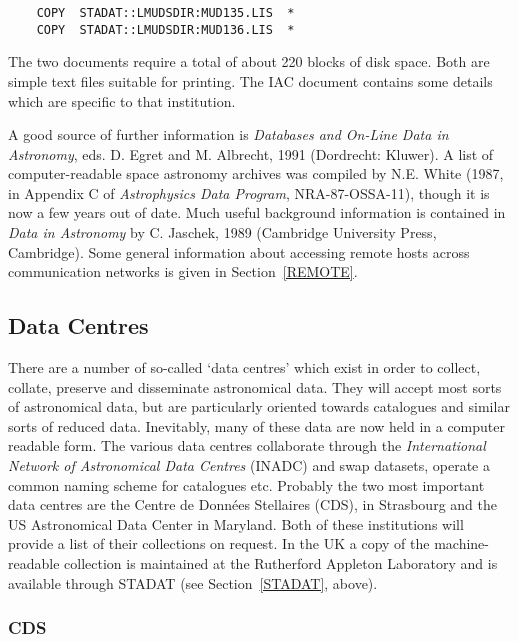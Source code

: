 \documentclass[twoside,11pt]{article}
\newcommand{\xlabel}[1]{}
\begin{document}
\begin{verbatim}
    COPY  STADAT::LMUDSDIR:MUD135.LIS  *
    COPY  STADAT::LMUDSDIR:MUD136.LIS  *
\end{verbatim}

The two documents require a total of about 220 blocks of disk space. 
Both are simple text files suitable for printing. The IAC document 
contains some details which are specific to that institution.

A good source of further information is {\it Databases and On-Line Data 
in Astronomy}, eds. D. Egret and M. Albrecht, 1991 (Dordrecht: Kluwer). 
A list of computer-readable space astronomy archives was compiled by 
N.E. White (1987, in Appendix C of {\it Astrophysics Data Program}, 
NRA-87-OSSA-11), though it is now a few years out of date. Much useful 
background information is contained in {\it Data in Astronomy} by C. 
Jaschek, 1989 (Cambridge University Press, Cambridge). Some general 
information about accessing remote hosts across communication networks 
is given in Section~\ref{REMOTE}.

\subsection{Data Centres
\xlabel{data_centres}\label{INADC}}

There are a number of so-called `data centres' which exist in order to
collect, collate, preserve and disseminate astronomical data. They will
accept most sorts of astronomical data, but are particularly oriented
towards catalogues and similar sorts of reduced data. Inevitably, many
of these data are now held in a computer readable form. The various data
centres collaborate through the {\it International Network of 
Astronomical Data Centres} (INADC) and swap datasets, operate a common 
naming scheme for catalogues etc. Probably the two most important data 
centres are the Centre de Donn\'{e}es Stellaires (CDS), in Strasbourg 
and the US Astronomical Data Center in Maryland. Both of these 
institutions will provide a list of their collections on request. In the
UK a copy of the machine-readable collection is maintained at the 
Rutherford Appleton Laboratory and is available through STADAT (see 
Section~\ref{STADAT}, above).

\subsubsection{CDS
\xlabel{cds}\label{CDS}}
\end{document}
